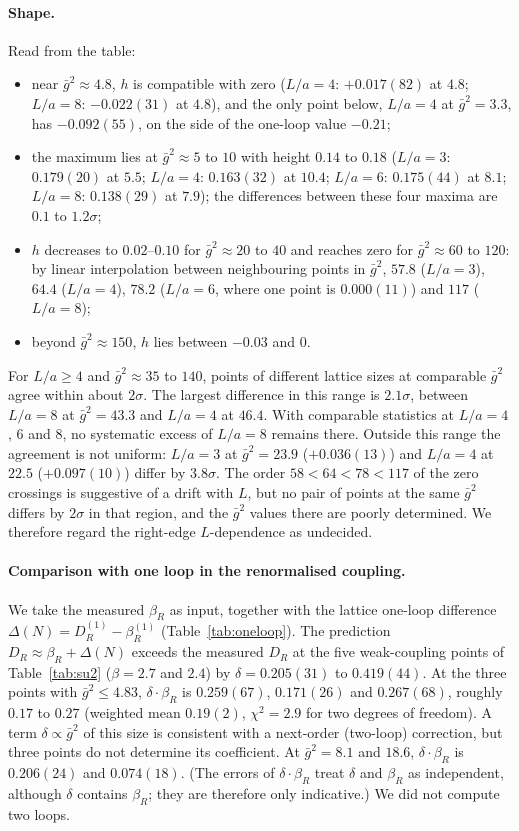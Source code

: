 \documentclass[11pt,a4paper]{article}
\theoremstyle{definition}
\theoremstyle{remark}
\newcommand{\gb}{\bar g^{2}}
\newcommand{\bR}{\beta_R}
\newcommand{\DR}{D_R}
\begin{document}
\paragraph{Shape.} Read from the table:
\begin{itemize}[leftmargin=2em]
\item near $\gb\approx4.8$, $h$ is compatible with zero ($L/a=4$: $+0.017(82)$ at $4.8$; $L/a=8$: $-0.022(31)$ at $4.8$), and the only point below, $L/a=4$ at $\gb=3.3$, has $-0.092(55)$, on the side of the one-loop value $-0.21$;
\item the maximum lies at $\gb\approx5$ to $10$ with height $0.14$ to $0.18$ ($L/a=3$: $0.179(20)$ at $5.5$; $L/a=4$: $0.163(32)$ at $10.4$; $L/a=6$: $0.175(44)$ at $8.1$; $L/a=8$: $0.138(29)$ at $7.9$); the differences between these four maxima are $0.1$ to $1.2\sigma$;
\item $h$ decreases to $0.02$--$0.10$ for $\gb\approx20$ to $40$ and reaches zero for $\gb\approx60$ to $120$: by linear interpolation between neighbouring points in $\gb$, $57.8$ ($L/a=3$), $64.4$ ($L/a=4$), $78.2$ ($L/a=6$, where one point is $0.000(11)$) and $117$ ($L/a=8$);
\item beyond $\gb\approx150$, $h$ lies between $-0.03$ and $0$.
\end{itemize}
For $L/a\ge4$ and $\gb\approx35$ to $140$, points of different lattice sizes at comparable $\gb$ agree within about $2\sigma$. The largest difference in this range is $2.1\sigma$, between $L/a=8$ at $\gb=43.3$ and $L/a=4$ at $46.4$. With comparable statistics at $L/a=4$, $6$ and $8$, no systematic excess of $L/a=8$ remains there. Outside this range the agreement is not uniform: $L/a=3$ at $\gb=23.9$ ($+0.036(13)$) and $L/a=4$ at $22.5$ ($+0.097(10)$) differ by $3.8\sigma$. The order $58<64<78<117$ of the zero crossings is suggestive of a drift with $L$, but no pair of points at the same $\gb$ differs by $2\sigma$ in that region, and the $\gb$ values there are poorly determined. We therefore regard the right-edge $L$-dependence as undecided.

\paragraph{Comparison with one loop in the renormalised coupling.} We take the measured $\bR$ as input, together with the lattice one-loop difference $\Delta(N)=\DR^{(1)}-\bR^{(1)}$ (Table~\ref{tab:oneloop}). The prediction $\DR\approx\bR+\Delta(N)$ exceeds the measured $\DR$ at the five weak-coupling points of Table~\ref{tab:su2} ($\beta=2.7$ and $2.4$) by $\delta=0.205(31)$ to $0.419(44)$. At the three points with $\gb\le4.83$, $\delta\cdot\bR$ is $0.259(67)$, $0.171(26)$ and $0.267(68)$, roughly $0.17$ to $0.27$ (weighted mean $0.19(2)$, $\chi^2=2.9$ for two degrees of freedom). A term $\delta\propto\gb$ of this size is consistent with a next-order (two-loop) correction, but three points do not determine its coefficient. At $\gb=8.1$ and $18.6$, $\delta\cdot\bR$ is $0.206(24)$ and $0.074(18)$. (The errors of $\delta\cdot\bR$ treat $\delta$ and $\bR$ as independent, although $\delta$ contains $\bR$; they are therefore only indicative.) We did not compute two loops.
\end{document}
